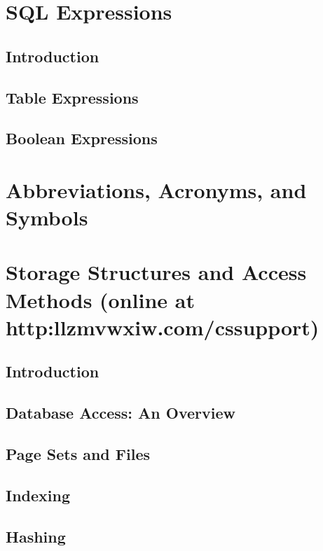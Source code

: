 \documentclass{book}
\begin{document}
\chapter{SQL Expressions}

\section{Introduction}

\section{Table Expressions}

\section{Boolean Expressions}






\chapter{Abbreviations, Acronyms, and Symbols}







\chapter{Storage Structures and Access Methods (online at http:llzmvwxiw.com/cssupport)}

\section{Introduction}

\section{Database Access: An Overview}

\section{Page Sets and Files}

\section{Indexing}

\section{Hashing}
\end{document}
